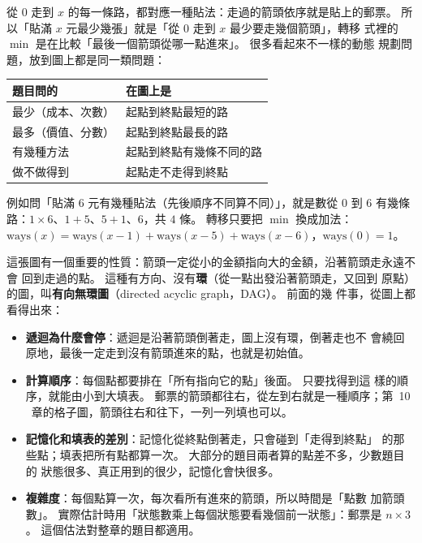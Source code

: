 從 $0$ 走到 $x$ 的每一條路，都對應一種貼法：走過的箭頭依序就是貼上的郵票。
所以「貼滿 $x$ 元最少幾張」就是「從 $0$ 走到 $x$ 最少要走幾個箭頭」，轉移
式裡的 $\min$ 是在比較「最後一個箭頭從哪一點進來」。 很多看起來不一樣的動態
規劃問題，放到圖上都是同一類問題：

\begin{center}
\begin{tabular}{ll}
\toprule
題目問的 & 在圖上是 \\
\midrule
最少（成本、次數） & 起點到終點最短的路 \\
最多（價值、分數） & 起點到終點最長的路 \\
有幾種方法 & 起點到終點有幾條不同的路 \\
做不做得到 & 起點走不走得到終點 \\
\bottomrule
\end{tabular}
\end{center}

例如問「貼滿 $6$ 元有幾種貼法（先後順序不同算不同）」，就是數從 $0$ 到 $6$
有幾條路：$1 \times 6$、$1 + 5$、$5 + 1$、$6$，共 $4$ 條。 轉移只要把
$\min$ 換成加法：$\mathrm{ways}(x) = \mathrm{ways}(x - 1) + \mathrm{ways}(x - 5)
+ \mathrm{ways}(x - 6)$，$\mathrm{ways}(0) = 1$。

這張圖有一個重要的性質：箭頭一定從小的金額指向大的金額，沿著箭頭走永遠不會
回到走過的點。 這種有方向、沒有\textbf{環}（從一點出發沿著箭頭走，又回到
原點）的圖，叫\textbf{有向無環圖}（directed acyclic graph，DAG）。 前面的幾
件事，從圖上都看得出來：

\begin{itemize}
\item \textbf{遞迴為什麼會停}：遞迴是沿著箭頭倒著走，圖上沒有環，倒著走也不
會繞回原地，最後一定走到沒有箭頭進來的點，也就是初始值。
\item \textbf{計算順序}：每個點都要排在「所有指向它的點」後面。 只要找得到這
樣的順序，就能由小到大填表。 郵票的箭頭都往右，從左到右就是一種順序；第~10
~章的格子圖，箭頭往右和往下，一列一列填也可以。
\item \textbf{記憶化和填表的差別}：記憶化從終點倒著走，只會碰到「走得到終點」
的那些點；填表把所有點都算一次。 大部分的題目兩者算的點差不多，少數題目的
狀態很多、真正用到的很少，記憶化會快很多。
\item \textbf{複雜度}：每個點算一次，每次看所有進來的箭頭，所以時間是「點數
加箭頭數」。 實際估計時用「狀態數乘上每個狀態要看幾個前一狀態」：郵票是
$n \times 3$。 這個估法對整章的題目都適用。
\end{itemize}


